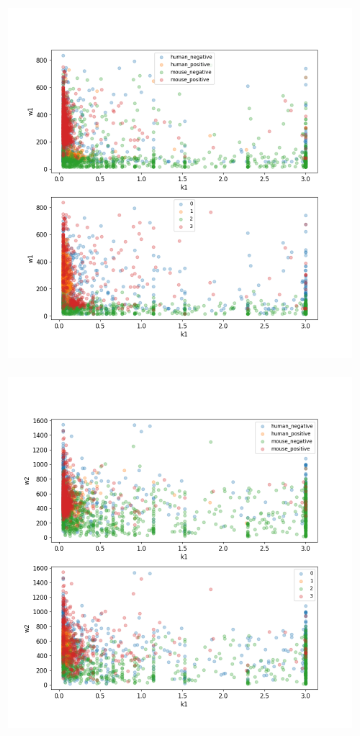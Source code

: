 \begin{figure}
\begin{subfigure}{0.3\textwidth}
	\end{subfigure}
	\hfill
	\begin{subfigure}{0.3\textwidth}
		\includegraphics[width=\textwidth]{fig/seperate_k1_w1}
	\end{subfigure}
	\hfill
	\begin{subfigure}{0.3\textwidth}
		\includegraphics[width=\textwidth]{fig/seperate_k1_w2}

\end{subfigure}
\end{figure}
